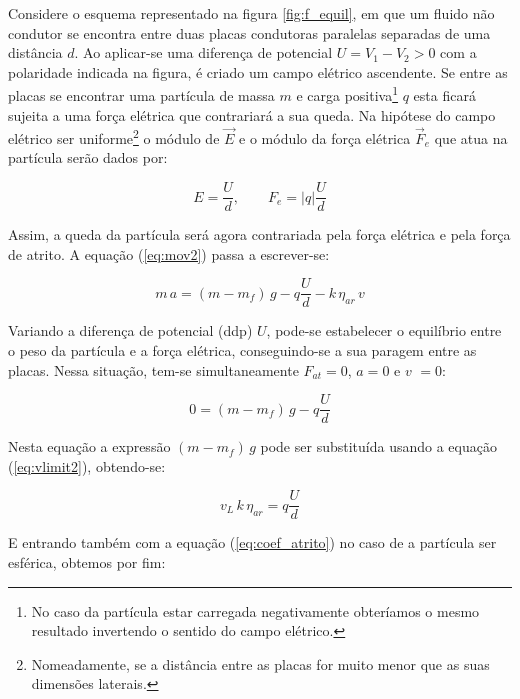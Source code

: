 \documentclass[a4paper,twoside,12pt]{article}      %
\begin{document}
Considere o esquema representado na figura \ref{fig:f_equil}, em que um fluido não condutor se encontra entre duas placas condutoras paralelas separadas de uma distância $d$. Ao aplicar-se uma diferença de potencial \mbox{$U = V_1 -V_2 > 0$} com a polaridade indicada na figura, é criado um campo elétrico ascendente. Se entre as placas se encontrar uma partícula de massa $m$ e carga positiva\footnote{No caso da partícula estar carregada negativamente obteríamos o mesmo resultado invertendo o sentido do campo elétrico.} $q$  esta ficará sujeita a uma força elétrica que contrariará a sua queda.
Na hipótese do campo elétrico ser uniforme\footnote{Nomeadamente, se a distância entre as placas for muito menor que as suas dimensões laterais.} o módulo de $\vec{E}$ e o módulo da força elétrica $\vec{F}_e$ que atua na partícula serão dados por:


\begin{equation*}
	E = \frac{U}{d}, \qquad  F_e = |q| \frac{U}{d}
\end{equation*}



Assim, a queda da partícula será agora contrariada pela força elétrica e pela força de atrito.
A equação (\ref{eq:mov2}) passa a escrever-se:

\begin{equation}
	\label{eq:mov3}
	m\,a = (m - m_f)\,g  - q \frac{U}{d} - k  \, \eta_{ar} \, v
\end{equation}

Variando a diferença de potencial (ddp) $U$, pode-se estabelecer o equilíbrio entre o peso da partícula e a força elétrica, conseguindo-se a sua paragem entre as placas. Nessa situação, tem-se simultaneamente $F_{at}=0$, $a=0$ e  $v$  $=0$:

\begin{equation}
	\label{eq:equil}
	0 = (m - m_f)\,g  - q \frac{U}{d} 
\end{equation}

Nesta equação a expressão $(m - m_f)\,g$ pode ser substituída usando a equação (\ref{eq:vlimit2}), obtendo-se:

\begin{equation*}
	v_L\, k\, \eta_{ar} = q \frac{U}{d}
\end{equation*}

E entrando também com a equação (\ref{eq:coef_atrito}) no caso de a partícula ser esférica, obtemos por fim:
\end{document}
